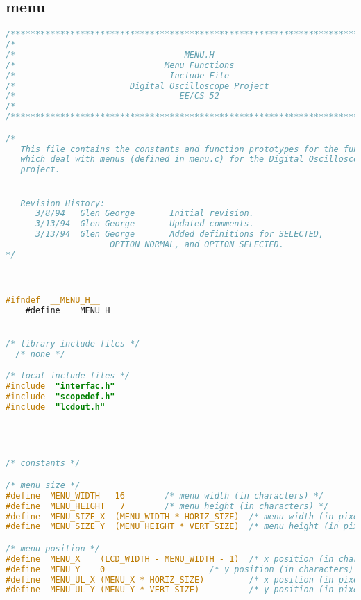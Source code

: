 \subsection{menu}
\begin{lstlisting}[language=C]
/****************************************************************************/
/*                                                                          */
/*                                  MENU.H                                  */
/*                              Menu Functions                              */
/*                               Include File                               */
/*                       Digital Oscilloscope Project                       */
/*                                 EE/CS 52                                 */
/*                                                                          */
/****************************************************************************/

/*
   This file contains the constants and function prototypes for the functions
   which deal with menus (defined in menu.c) for the Digital Oscilloscope
   project.


   Revision History:
      3/8/94   Glen George       Initial revision.
      3/13/94  Glen George       Updated comments.
      3/13/94  Glen George       Added definitions for SELECTED,
      				 OPTION_NORMAL, and OPTION_SELECTED.
*/



#ifndef  __MENU_H__
    #define  __MENU_H__


/* library include files */
  /* none */

/* local include files */
#include  "interfac.h"
#include  "scopedef.h"
#include  "lcdout.h"




/* constants */

/* menu size */
#define  MENU_WIDTH   16		/* menu width (in characters) */
#define  MENU_HEIGHT   7		/* menu height (in characters) */
#define  MENU_SIZE_X  (MENU_WIDTH * HORIZ_SIZE)  /* menu width (in pixels) */
#define  MENU_SIZE_Y  (MENU_HEIGHT * VERT_SIZE)  /* menu height (in pixels) */

/* menu position */
#define  MENU_X    (LCD_WIDTH - MENU_WIDTH - 1)  /* x position (in characters) */
#define  MENU_Y    0			         /* y position (in characters) */
#define  MENU_UL_X (MENU_X * HORIZ_SIZE)         /* x position (in pixels) */
#define  MENU_UL_Y (MENU_Y * VERT_SIZE)          /* y position (in pixels) */


\end{lstlisting}

